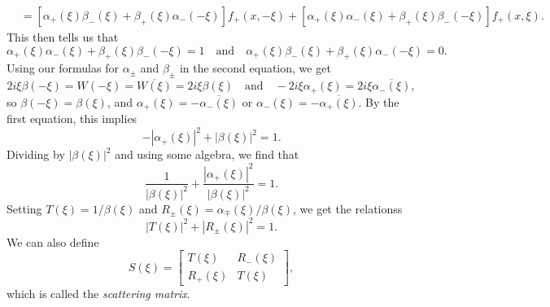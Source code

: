 \begin{remark}
\begin{align*}
    &= [\alpha_+(\xi) \beta_-(\xi) + \beta_+(\xi) \alpha_-(-\xi)] f_+(x, -\xi)
    + [\alpha_+(\xi) \alpha_-(\xi) + \beta_+(\xi) \beta_-(-\xi)] f_+(x, \xi).
  \end{align*}
  This then tells us that
  \[
    \alpha_+(\xi) \alpha_-(\xi) + \beta_+(\xi) \beta_-(-\xi) = 1
    \quad \text{and} \quad
    \alpha_+(\xi) \beta_-(\xi) + \beta_+(\xi) \alpha_-(-\xi) = 0.
  \]
  Using our formulas for $\alpha_{\pm}$ and $\beta_{\pm}$ in the second equation,
  we get
  \[
    2i \xi \beta(-\xi) = W(-\xi) = \overline{W(\xi)}
    = 2 i\xi \beta(\xi) \quad \text{and} \quad
    -2i \xi \alpha_+(\xi) = 2i\xi \overline{\alpha_-(\xi)},
  \]
  so $\beta(-\xi) = \beta(\xi)$, and
  $\alpha_+(\xi) = -\overline{\alpha_-(\xi)}$
  or $\alpha_-(\xi) = -\overline{\alpha_+(\xi)}$.
  By the first equation, this implies
  \[
    -|\alpha_+(\xi)|^2 + |\beta(\xi)|^2 = 1.
  \]
  Dividing by $|\beta(\xi)|^2$ and using some algebra,
  we find that
  \[
    \frac{1}{|\beta(\xi)|^2}
    + \frac{|\alpha_+(\xi)|^2}{|\beta(\xi)|^2} = 1.
  \]
  Setting $T(\xi) = 1 / \beta(\xi)$ and
  $R_{\pm}(\xi) = \alpha_{\mp}(\xi) / \beta(\xi)$,
  we get the relationss
  \[
    |T(\xi)|^2 + |R_{\pm}(\xi)|^2 = 1.
  \]
  We can also define
  \[
    S(\xi) =
    \begin{bmatrix}
      T(\xi) & R_-(\xi) \\
      R_+(\xi) & T(\xi)
    \end{bmatrix},
  \]
  which is called the \emph{scattering matrix}.
\end{remark}
